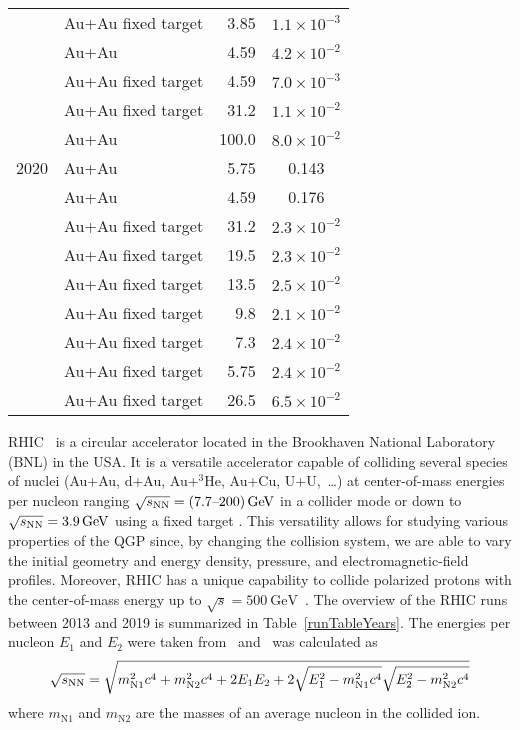 \begin{table}[!p]
\begin{center}
\begin{spacing}{1.0}
\begin{tabular}{llD{.}{.}{3.1}c}
       & Au+Au fixed target& 3.85 & $1.1\times 10^{-3}$\\
       & Au+Au & 4.59 & $4.2\times 10^{-2}$\\
       & Au+Au fixed target& 4.59 & $7.0\times 10^{-3}$\\
       & Au+Au fixed target& 31.2 & $1.1\times 10^{-2}$\\
       & Au+Au & 100.0 & $8.0\times 10^{-2}$\\
 2020 & Au+Au & 5.75 & 0.143\\
       & Au+Au & 4.59 & 0.176\\
       &  Au+Au fixed target& 31.2 & $2.3\times 10^{-2}$\\
       &  Au+Au fixed target& 19.5 & $2.3\times 10^{-2}$\\
       &  Au+Au fixed target& 13.5 & $2.5\times 10^{-2}$\\
       &  Au+Au fixed target& 9.8  & $2.1\times 10^{-2}$\\
       &  Au+Au fixed target& 7.3  & $2.4\times 10^{-2}$\\
       &  Au+Au fixed target& 5.75 & $2.4\times 10^{-2}$\\
       &  Au+Au fixed target& 26.5 & $6.5\times 10^{-2}$\\
\bottomrule
\end{tabular}
\end{spacing}
\renewcommand{\arraystretch}{1.5}
\end{center}
\end{table} 

RHIC~\cite{RHICproject, RHICdesign} is a circular accelerator located in the Brookhaven National Laboratory 
(BNL) in the USA\@. It is a versatile accelerator capable of
colliding several species of nuclei (Au+Au, d+Au, Au+$^3$He, Au+Cu, U+U,~\dots) at
center-of-mass energies per nucleon
ranging $\sqrt{s_\text{NN}} = (\text{7.7--200})\,\si{\giga\electronvolt}$ in a collider mode or down to
$\sqrt{s_\text{NN}} = 3.9\,\si{\giga\electronvolt}$
using a fixed target \cite{fixedTarget}\@. This versatility allows for studying various properties of the QGP since, by changing the collision system, we are able to vary the initial geometry and energy density, pressure, and electromagnetic-field profiles. Moreover, RHIC has a unique capability to collide polarized protons with
the center-of-mass energy up to $\sqrt{s} = \SI{500}{\giga\electronvolt}$~\cite{polarizedProtons}\@. The overview
of the RHIC runs between 2013 and 2019 is summarized in Table~\ref{runTableYears}\@. The energies per nucleon $E_1$ and $E_2$ were taken from~\cite{RHICrunsTable} and \snn\ was calculated as
\begin{equation}
 \sqrt{s_\text{NN}} = \sqrt{m_\mathrm{N1}^2c^4 + m_\mathrm{N2}^2c^4 + 2E_1E_2 + 2\sqrt{E_1^2-m_\mathrm{N1}^2c^4}\sqrt{E_2^2-m_\mathrm{N2}^2c^4}}
\end{equation}
where $m_\mathrm{N1}$ and $m_\mathrm{N2}$ are the masses of an average nucleon in the collided ion.


